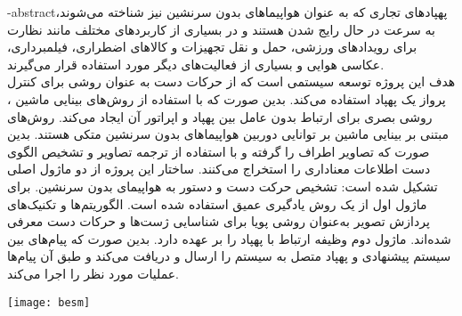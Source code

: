 \department{}
\secondsupervisor{}

\fa-abstract{پهپادهای تجاری که به عنوان هواپیما‌های بدون سرنشین 
نیز شناخته می‌شوند، به سرعت در حال رایج شدن هستند و در بسیاری از کاربردهای مختلف مانند نظارت برای رویدادهای ورزشی، حمل و نقل تجهیزات
 و کالاهای اضطراری، فیلمبرداری، عکاسی هوایی و بسیاری از فعالیت‌های دیگر مورد استفاده قرار می‌گیرند.
  \\
هدف این پروژه توسعه سیستمی است که از حرکات دست به عنوان روشی برای کنترل پرواز یک پهپاد استفاده می‌کند.
بدین صورت که با استفاده از روش‌های بینایی ماشین ، روشی بصری برای ارتباط بدون عامل بین پهپاد و اپراتور آن ایجاد می‌کند.
 روش‌های مبتنی بر بینایی ماشین بر توانایی دوربین هواپیماهای بدون سرنشین متکی هستند. بدین صورت که تصاویر اطراف را گرفته و با استفاده
 از  ترجمه تصاویر و تشخیص الگوی دست اطلاعات معناداری را استخراج می‌کنند. ساختار این پروژه از دو ماژول
 اصلی تشکیل شده است: تشخیص حرکت دست
 و دستور به هواپیمای بدون سرنشین. برای ماژول اول از یک روش
 یادگیری عمیق استفاده شده است. الگوریتم‌ها و تکنیک‌های پردازش تصویر به‌عنوان روشی پویا برای شناسایی ژست‌ها و
 حرکات دست معرفی شده‌اند. ماژول دوم وظیفه ارتباط با پهپاد را بر عهده دارد. بدین صورت که پیام‌های بین سیستم
 پیشنهادی و پهپاد متصل به سیستم را ارسال و دریافت می‌کند و طبق آن پیام‌ها عملیات مورد نظر را اجرا می‌کند.
  }





\vspace*{7cm}
\thispagestyle{empty}
\begin{center}
\texttt{[image: besm]}
\end{center}